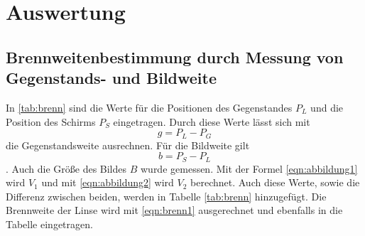 \section{Auswertung}
\label{sec:Auswertung}

\subsection{Brennweitenbestimmung durch Messung von Gegenstands- und Bildweite}

In \ref{tab:brenn} sind die Werte für die Positionen des Gegenstandes $P_L$ und die Position des Schirms $P_S$ eingetragen.
Durch diese Werte lässt sich mit
\begin{equation}
  g=P_L-P_G
\end{equation}
die Gegenstandsweite ausrechnen.
Für die Bildweite gilt
\begin{equation}
  b=P_S-P_L
\end{equation}.
Auch die Größe des Bildes $B$ wurde gemessen.
Mit der Formel \ref{eqn:abbildung1} wird $V_1$ und mit \ref{eqn:abbildung2} wird $V_2$ berechnet.
Auch diese Werte, sowie die Differenz zwischen beiden, werden in Tabelle \ref{tab:brenn} hinzugefügt.
Die Brennweite der Linse wird mit \ref{eqn:brenn1} ausgerechnet und ebenfalls in die Tabelle eingetragen.

